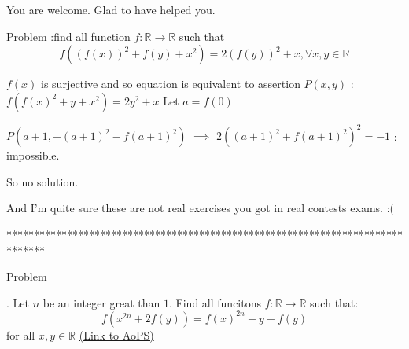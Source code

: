 \begin{solution}
	You are welcome. Glad to have helped you.

\begin{tcolorbox}Problem :find all function $f:\mathbb{R}\to\mathbb{R}$ such that 
\[f( (f(x))^2+f(y) + x^2)=2(f(y))^2+x,\forall x,y\in\mathbb{R}\]\end{tcolorbox}

$f(x)$ is surjective and so equation is equivalent to assertion $P(x,y)$ : $f(f(x)^2+y+x^2)=2y^2+x$
Let $a=f(0)$

$P(a+1,-(a+1)^2-f(a+1)^2)$ $\implies$ $2((a+1)^2+f(a+1)^2)^2=-1$ : impossible.

So no solution.

And I'm quite sure these are not real exercises you got in real contests \/ exams.  :(
\end{solution}
*******************************************************************************
-------------------------------------------------------------------------------

\begin{problem}
	\begin{bolded}Problem\end{bolded}. Let $n$ be an integer great than $1$. Find all funcitons $f:\mathbb{R}\rightarrow \mathbb{R}$ such that: \[f(x^{2n}+2f(y))=f(x)^{2n}+y+f(y)\] for all $x,y\in \mathbb{R}$
	\flushright \href{https://artofproblemsolving.com/community/c6h561529}{(Link to AoPS)}
\end{problem}



